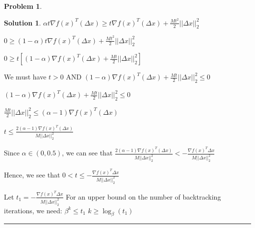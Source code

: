 \documentclass{article}
\theoremstyle{definition}
\newtheorem{problem}{Problem}
\def\fline{\rule{0.75\linewidth}{0.5pt}}
\newcommand{\finishline}{\begin{center}\fline\end{center}}
\newtheorem*{solution*}{Solution}
\newenvironment{solution}{\begin{solution*}}{{\finishline} \end{solution*}}
\begin{document}
\begin{problem}
\begin{solution}
$\alpha t\nabla f(x)^T (\Delta x) \geq t\nabla f(x)^T (\Delta x) + \frac{Mt^2}{2} ||\Delta x||^2_2$

$0 \geq (1 - \alpha) t \nabla f(x)^T (\Delta x) + \frac{Mt^2}{2} ||\Delta x||^2_2$

$0 \geq t[(1 - \alpha) \nabla f(x)^T (\Delta x) + \frac{Mt}{2} ||\Delta x||^2_2]$

We must have $t > 0$ AND $(1 - \alpha) \nabla f(x)^T (\Delta x) + \frac{Mt}{2} ||\Delta x||^2_2 \leq 0$

$(1 - \alpha) \nabla f(x)^T (\Delta x) + \frac{Mt}{2} ||\Delta x||^2_2 \leq 0$ \newline 

$\frac{Mt}{2} ||\Delta x||^2_2 \leq (\alpha - 1) \nabla f(x)^T (\Delta x)$ \newline 

$t \leq \frac{2(\alpha - 1) \nabla f(x)^T (\Delta x)}{M||\Delta x||^2_2}$ \newline 



Since $\alpha \in (0, 0.5)$, we can see that $\frac{2(\alpha - 1) \nabla f(x)^T (\Delta x)}{M||\Delta x||^2_2} < -\frac{\nabla f(x)^T \Delta x}{M ||\Delta x||^2_2}$ \newline 

Hence, we see that $0 < t \leq -\frac{\nabla f(x)^T \Delta x}{M ||\Delta x||^2_2}$

Let $t_1 = -\frac{\nabla f(x)^T \Delta x}{M ||\Delta x||^2_2}$ \newline
For an upper bound on the number of backtracking iterations, we need: \newline 
$\beta^k \leq t_1$ \newline
$k \geq \log _{\beta}(t_1)$ \newline

\end{solution}
\end{problem}
\end{document}
